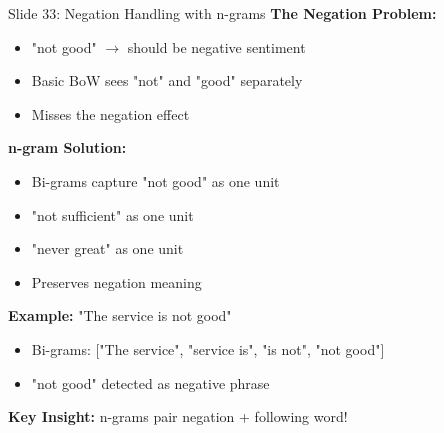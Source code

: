 \documentclass[8pt]{beamer}
\begin{document}
	\begin{frame}{Slide 33: Negation Handling with n-grams}
		\fontsize{6.5}{7.5}\selectfont
		\textbf{The Negation Problem:}
		\begin{itemize}
			\item "not good" $\to$ should be negative sentiment
			\item Basic BoW sees "not" and "good" separately
			\item Misses the negation effect
		\end{itemize}
		
		\vspace{0.1cm}
		\textbf{n-gram Solution:}
		\begin{itemize}
			\item Bi-grams capture "not good" as one unit
			\item "not sufficient" as one unit
			\item "never great" as one unit
			\item Preserves negation meaning
		\end{itemize}
		
		\vspace{0.1cm}
		\textbf{Example:}
		"The service is not good"
		\begin{itemize}
			\item Bi-grams: ["The service", "service is", "is not", "not good"]
			\item "not good" detected as negative phrase
		\end{itemize}
		
		\textcolor{myblue}{\textbf{Key Insight:}} n-grams pair negation + following word!
	\end{frame}
	
\end{document}
